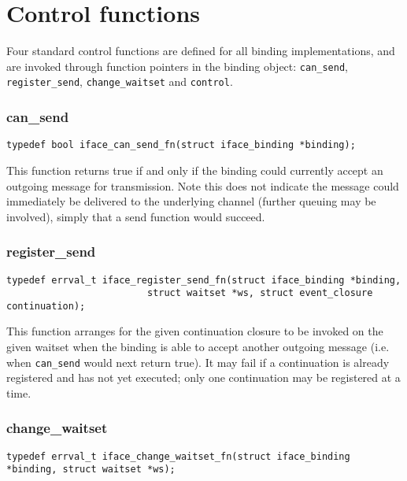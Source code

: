 \documentclass[a4paper,twoside]{report} %
\begin{document}
\section{Control functions}

Four standard control functions are defined for all binding implementations,
and are invoked through function pointers in the binding object:
\lstinline+can_send+, \lstinline+register_send+, \lstinline+change_waitset+
and \lstinline+control+.

\subsubsection*{can\_send}

\begin{lstlisting}
typedef bool iface_can_send_fn(struct iface_binding *binding);
\end{lstlisting}

This function returns true if and only if the binding could currently accept
an outgoing message for transmission. Note this does not indicate the message
could immediately be delivered to the underlying channel (further queuing
may be involved), simply that a send function would succeed.

\subsubsection*{register\_send}

\begin{lstlisting}
typedef errval_t iface_register_send_fn(struct iface_binding *binding,
                         struct waitset *ws, struct event_closure continuation);
\end{lstlisting}

This function arranges for the given continuation closure to be invoked on the
given waitset when the binding is able to accept another outgoing message
(i.e. when \lstinline+can_send+ would next return true).
It may fail if a continuation is already registered and has not yet executed;
only one continuation may be registered at a time.

\subsubsection*{change\_waitset}

\begin{lstlisting}
typedef errval_t iface_change_waitset_fn(struct iface_binding *binding, struct waitset *ws);
\end{lstlisting}
\end{document}
